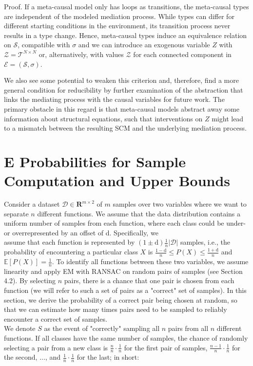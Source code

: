 \documentclass[10pt]{article}
\begin{document}
Proof. If a meta-causal model only has loops as transitions, the meta-causal types are independent of the modeled mediation process. While types can differ for different starting conditions in the environment, its transition process never results in a type change. Hence, meta-causal types induce an equivalence relation on $\mathcal{S}$, compatible with $\sigma$ and we can introduce an exogenous variable $Z$ with $\mathcal{Z}=\mathcal{T}^{N \times N}$ or, alternatively, with values $\mathcal{Z}$ for each connected component in $\mathcal{E}=(\mathcal{S}, \sigma)$.

We also see some potential to weaken this criterion and, therefore, find a more general condition for reducibility by further examination of the abstraction that links the mediating process with the causal variables for future work. The primary obstacle in this regard is that meta-causal models abstract away some information about structural equations, such that interventions on $Z$ might lead to a mismatch between the resulting SCM and the underlying mediation process.

\section*{E Probabilities for Sample Computation and Upper Bounds}
Consider a dataset $\mathcal{D} \in \mathbf{R}^{m \times 2}$ of $m$ samples over two variables where we want to separate $n$ different functions. We assume that the data distribution contains a uniform number of samples from each function, where each class could be under- or overrepresented by an offset of d. Specifically, we\\
assume that each function is represented by $(1 \pm \mathrm{d}) \frac{1}{n}|\mathcal{D}|$ samples, i.e., the probability of encountering a particular class $X$ is $\frac{1-\mathrm{d}}{n} \leq P(X) \leq \frac{1+\mathrm{d}}{n}$ and $\mathbb{E}[P(X)]=\frac{1}{n}$. To identify all functions between these two variables, we assume linearity and apply EM with RANSAC on random pairs of samples (see Section 4.2). By selecting $n$ pairs, there is a chance that one pair is chosen from each function (we will refer to such a set of pairs as a "correct" set of samples). In this section, we derive the probability of a correct pair being chosen at random, so that we can estimate how many times pairs need to be sampled to reliably encounter a correct set of samples.\\
We denote $S$ as the event of "correctly" sampling all $n$ pairs from all $n$ different functions. If all classes have the same number of samples, the chance of randomly selecting a pair from a new class is $\frac{n}{n} \cdot \frac{1}{n}$ for the first pair of samples, $\frac{n-1}{n} \cdot \frac{1}{n}$ for the second, $\ldots$, and $\frac{1}{n} \cdot \frac{1}{n}$ for the last; in short:
\end{document}
